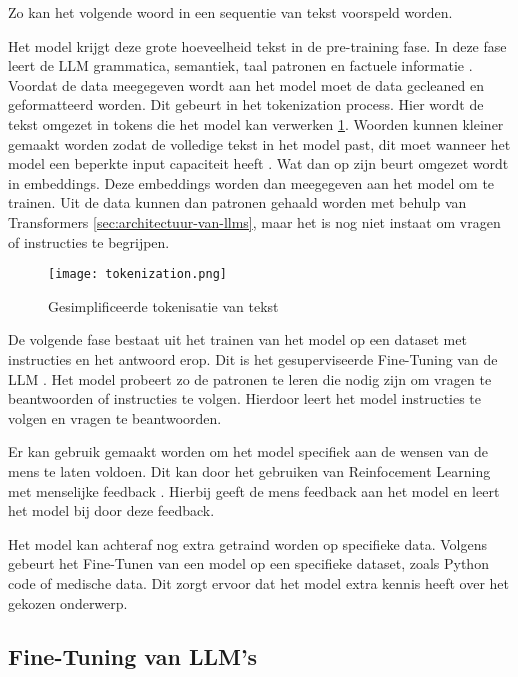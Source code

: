 Zo kan het volgende woord in een sequentie van tekst voorspeld worden.

Het model krijgt deze grote hoeveelheid tekst in de pre-training fase.
In deze fase leert de LLM grammatica, semantiek, taal patronen en factuele informatie \autocite{Cacic2023}.
Voordat de data meegegeven wordt aan het model moet de data gecleaned en geformatteerd worden.
Dit gebeurt in het tokenization process. Hier wordt de tekst omgezet in tokens die het model kan verwerken \ref{fig:tokenization}.
Woorden kunnen kleiner gemaakt worden zodat de volledige tekst in het model past, dit moet wanneer het model een beperkte input capaciteit heeft \autocite{ElHousieny2023}.
Wat dan op zijn beurt omgezet wordt in embeddings. Deze embeddings worden dan meegegeven aan het model om te trainen.
Uit de data kunnen dan patronen gehaald worden met behulp van Transformers \ref{sec:architectuur-van-llms}, maar het is nog niet instaat om vragen of instructies te begrijpen.

\begin{figure}[h]
  \centering
  \texttt{[image: tokenization.png]}
  \caption[Tokenisatie van tekst]{Gesimplificeerde tokenisatie van tekst \autocite{TeeTracker2023}}
  \label{fig:tokenization}
\end{figure}

De volgende fase bestaat uit het trainen van het model op een dataset met instructies en het antwoord erop. 
Dit is het gesuperviseerde Fine-Tuning van de LLM \autocite{Das2024}.
Het model probeert zo de patronen te leren die nodig zijn om vragen te beantwoorden of instructies te volgen.
Hierdoor leert het model instructies te volgen en vragen te beantwoorden.

Er kan gebruik gemaakt worden om het model specifiek aan de wensen van de mens te laten voldoen. Dit kan door het gebruiken van Reinfocement Learning met menselijke feedback \autocite{LambertEtAL2022}. 
Hierbij geeft de mens feedback aan het model en leert het model bij door deze feedback.

Het model kan achteraf nog extra getraind worden op specifieke data. 
Volgens \textcite{Peckham2024} gebeurt het Fine-Tunen van een model op een specifieke dataset, zoals Python code of medische data.
Dit zorgt ervoor dat het model extra kennis heeft over het gekozen onderwerp.

\subsection{Fine-Tuning van LLM's}
\label{sec:fine-tuning-van-llms}

